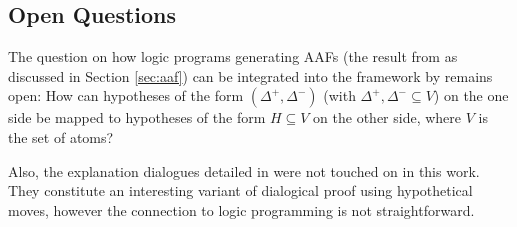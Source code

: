 \documentclass[a4paper]{article}
\begin{document}
\subsection{Open Questions}

The question on how logic programs generating AAFs (the result from \citet{DBLP:journals/sLogica/WuCG09} as discussed in Section \ref{sec:aaf}) can be integrated into the framework by \citet{DBLP:journals/tcs/EiterGL97} remains open: How can hypotheses of the form $(\Delta^+, \Delta^-)$ (with $\Delta^+, \Delta^- \subseteq V$) on the one side be mapped to hypotheses of the form $H \subseteq V$ on the other side, where $V$ is the set of atoms?

Also, the explanation dialogues detailed in \cite[Section 4]{DBLP:conf/ecai/BoothGKRT14} were not touched on in this work. They constitute an interesting variant of dialogical proof using hypothetical moves, however the connection to logic programming is not straightforward.


\end{document}
